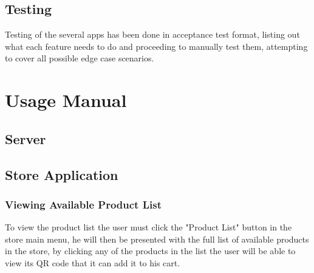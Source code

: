 \documentclass[12pt]{article}
\begin{document}
\subsection{Testing}
\hspace{0.6cm}
Testing of the several apps has been done in acceptance test format, listing out what each feature needs to do and proceeding to manually test them, attempting to cover all
possible edge case scenarios.

\pagebreak
\section{Usage Manual}

\subsection{Server}

\subsection{Store Application}
\subsubsection{Viewing Available Product List}
\hspace{0.6cm}
To view the product list the user must click the "Product List" button in the store main menu, he will then
be presented with the full list of available products in the store, by clicking any  of the products in the list
the user will be able to view its QR code that it can add it to his cart.
\end{document}
